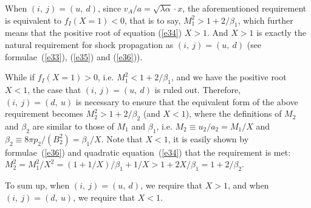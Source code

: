 \documentclass[fleqn,usenatbib]{mnras}
\begin{document}

When $(i,\ j)=(u,\ d)$, since $v_{A}/a=\sqrt{\lambda\alpha}\cdot x$, the aforementioned requirement is equivalent to $f_{I}(X=1)<0$, that is to say, $M_{1}^{2}>1+2/\beta_{1}$, which further means that the positive root of equation (\ref{e34}) $X>1$. And $X>1$ is exactly the natural requirement for shock propagation as $(i,\ j)=(u,\ d)$ (see formulae~(\ref{e33}), (\ref{e35}) and (\ref{e36})).

While if $f_{I}(X=1)>0$, i.e. $M_{1}^{2}<1+2/\beta_{1}$, and we have the positive root $X<1$, the case that $(i,\ j)=(u,\ d)$ is ruled out. Therefore, $(i,\ j)=(d,\ u)$ is necessary to ensure that the equivalent form of the above requirement becomes $M_{2}^{2}>1+2/\beta_{2}$ (and $X<1$), where the definitions of $M_{2}$ and $\beta_{2}$ are similar to those of $M_{1}$ and $\beta_{1}$, i.e. $M_{2}\equiv u_{2}/a_{2}=M_{1}/X$ and $\beta_{2}\equiv 8\pi p_{2}/\left(B_{2}^{2}\right)=\beta_{1}/X$. Note that $X<1$, it is easily shown by formulae~(\ref{e36}) and quadratic equation~(\ref{e34}) that the requirement is met: $M_{2}^{2}=M^{2}_{1}/X^{2}=(1+1/X)/\beta_{1}+1/X>1+2X/\beta_{1}=1+2/\beta_{2}$.



To sum up, when $(i,\ j)=(u,\ d)$, we require that $X>1$, and when $(i,\ j)=(d,\ u)$, we require that $X<1$.
\end{document}

